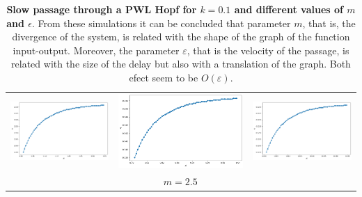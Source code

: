 \documentclass[a4paper,preprint,11pt]{article}
\begin{document}
\begin{table}[ht]
\begin{tabular}{ccc}
    \includegraphics[scale=0.2]{m25e005.png} & \includegraphics[scale=0.2]{m25e001.png} & \includegraphics[scale=0.2]{m25e0005.png}  \\
			& $m=2.5$   &  
    \end{tabular}
    \caption{\textbf{Slow passage through a PWL Hopf for $k=0.1$ and different values of $m$ and $\epsilon$}. From these simulations it can be concluded that parameter $m$, that is, the divergence of the system, is related with the shape of the graph of the function input-output. Moreover, the parameter $\varepsilon$, that is the velocity of the passage, is related with the size of the delay but also with a translation of the graph. Both efect seem to be  $O(\varepsilon)$.
    }
    \label{tab:plots}
\end{table}
\end{document}
